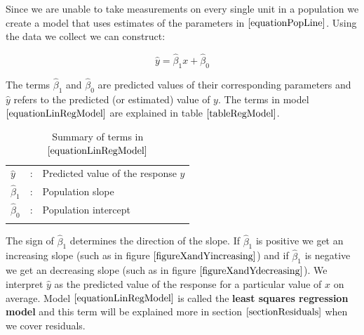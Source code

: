 Since we are unable to take measurements on every single unit in a population
we create a model that uses estimates of the parameters
in $\ref{equationPopLine}$.
Using the data we collect we can construct:

\begin{skeleton}
	\begin{equation}
	\label{equationLinRegModel}
		\hat{y} =  \hat{\beta}_{1} x + \hat{\beta}_{0}
	\end{equation}
\end{skeleton}
\hfill

The terms $\hat{\beta}_{1}$ and $\hat{\beta}_{0}$ are predicted values of their corresponding
parameters and $\hat{y}$ refers to the predicted (or estimated) value of $y$.
The terms in model $\ref{equationLinRegModel}$ are explained in table $\ref{tableRegModel}$.


\begin{table}[H]
\label{tableRegModel}
\large
\begin{center}
	\begin{tabular}{l c l}
	$\hat{y}$			& : &	Predicted value of the response $y$	\\
	$\hat{\beta}_{1}$	& : &	Population slope	\\	\index{Slope}
	$\hat{\beta}_{0}$	& : &	Population intercept	\\	\index{Intercept}
	\end{tabular}
\end{center}\vspace{-0.5cm}
\caption{Summary of terms in $\ref{equationLinRegModel}$}
\end{table}
\hfill

The sign of $\hat{\beta}_{1}$ determines the direction of the slope.
If $\hat{\beta}_{1}$ is positive we get an increasing slope 
(such as in figure $\ref{figureXandYincreasing}$)
and if $\hat{\beta}_{1}$ is negative we get an decreasing slope 
(such as in figure $\ref{figureXandYdecreasing}$).
We interpret $\hat{y}$ as the predicted value of the response 
for a particular value of $x$ on average.
Model $\ref{equationLinRegModel}$ is called the
\textbf{least squares regression model} 
and this term will be explained more in
section $\ref{sectionResiduals}$ when we cover residuals.

